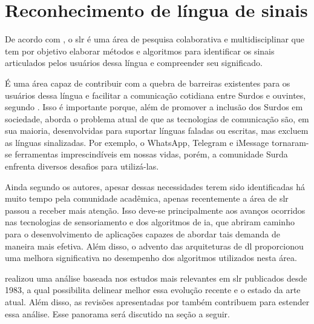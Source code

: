 \section{Reconhecimento de língua de sinais}
\label{sec:slr}

De acordo com , o \acrfull{slr} é uma área de pesquisa colaborativa e multidisciplinar que tem por objetivo elaborar métodos e algoritmos para identificar os sinais articulados pelos usuários dessa língua e compreender seu significado.



É uma área capaz de contribuir com a quebra de barreiras existentes para os usuários dessa língua e facilitar a comunicação cotidiana entre Surdos e ouvintes, segundo .
Isso é importante porque, além de promover a inclusão dos Surdos em sociedade, aborda o problema atual de que as tecnologias de comunicação são, em sua maioria, desenvolvidas para suportar línguas faladas ou escritas, mas excluem as línguas sinalizadas. Por exemplo, o WhatsApp, Telegram e iMessage tornaram-se ferramentas imprescindíveis em nossas vidas, porém, a comunidade Surda enfrenta diversos desafios para utilizá-las.

Ainda segundo os autores, apesar dessas necessidades terem sido identificadas há muito tempo pela comunidade acadêmica, apenas recentemente a área de \acrshort{slr} passou a receber mais atenção.
Isso deve-se principalmente aos avanços ocorridos nas tecnologias de sensoriamento e dos algoritmos de \acrshort{ia}, que abriram caminho para o desenvolvimento de aplicações capazes de abordar tais demanda de maneira mais efetiva. 
Além disso, o advento das arquiteturas de \acrshort{dl} proporcionou uma melhora significativa no desempenho dos algoritmos utilizados nesta área.

 realizou uma análise baseada nos estudos mais relevantes em \acrshort{slr} publicados desde 1983, a qual possibilita delinear melhor essa evolução recente e o estado da arte atual.
Além disso, as revisões apresentadas por  também contribuem para estender essa análise. Esse panorama será discutido na seção a seguir.


